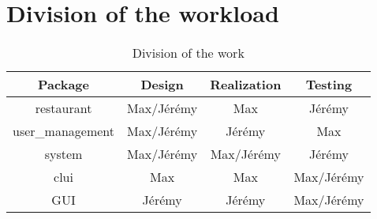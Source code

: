 \section{Division of the workload}
\label{sec:division_of_the_workload}




\begin{table}[H]
	\centering
	\label{tab:division_of_the_workload}
	\begin{tabular}{c | c | c | c}
		\textbf{Package} & \textbf{Design} & \textbf{Realization} & \textbf{Testing} \\
		\hline
		restaurant & Max/Jérémy & Max & Jérémy \\
		\hline
		user\_management & Max/Jérémy & Jérémy & Max \\
		\hline
		system & Max/Jérémy & Max/Jérémy & Jérémy \\
		\hline
		clui & Max & Max  & Max/Jérémy \\
		\hline
		GUI & Jérémy & Jérémy & Max/Jérémy \\
	\end{tabular}
	\caption{Division of the work}
\end{table}
